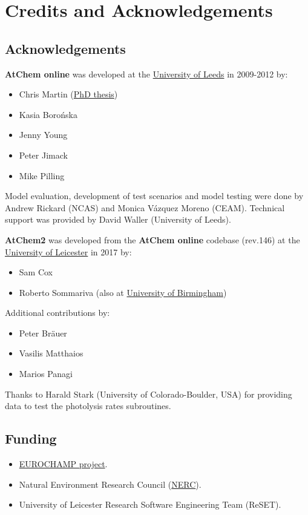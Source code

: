 \chapter{Credits and Acknowledgements} \label{ch:credits}

\section{Acknowledgements} \label{sec:acknowledgements}

\textbf{AtChem online} was developed at the
\href{https://www.leeds.ac.uk}{University of Leeds} in 2009-2012 by:

\begin{itemize}
\item Chris Martin (\href{http://etheses.whiterose.ac.uk/1596/}{PhD
    thesis})
\item Kasia Boro{\'n}ska
\item Jenny Young
\item Peter Jimack
\item Mike Pilling
\end{itemize}

Model evaluation, development of test scenarios and model testing were
done by Andrew Rickard (NCAS) and Monica V{\'a}zquez Moreno (CEAM).
Technical support was provided by David Waller (University of Leeds).

\textbf{AtChem2} was developed from the \textbf{AtChem online}
codebase (rev.146) at the \href{https://le.ac.uk}{University of
  Leicester} in 2017 by:

\begin{itemize}
\item Sam Cox
\item Roberto Sommariva (also at
  \href{https://www.birmingham.ac.uk}{University of Birmingham})
\end{itemize}

Additional contributions by:

\begin{itemize}
\item Peter Br{\"a}uer
\item Vasilis Matthaios
\item Marios Panagi
\end{itemize}

Thanks to Harald Stark (University of Colorado-Boulder, USA) for
providing data to test the photolysis rates subroutines.

\section{Funding} \label{sec:funding}

\begin{itemize}
\item \href{https://www.eurochamp.org/}{EUROCHAMP project}.
\item Natural Environment Research Council
  (\href{https://nerc.ukri.org/}{NERC}).
\item University of Leicester Research Software Engineering Team
  (ReSET).
\end{itemize}

